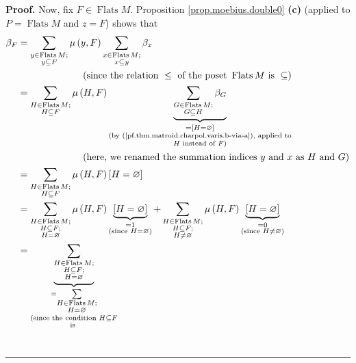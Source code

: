 \documentclass[numbers=enddot,12pt,final,onecolumn,notitlepage]{scrartcl}%
\theoremstyle{definition}
\newenvironment{proof}[1][Proof]{\noindent\textbf{#1.} }{\ \rule{0.5em}{0.5em}}
\let\sumnonlimits\sum
\renewcommand{\sum}{\sumnonlimits\limits}
\begin{document}
\begin{proof}
Now, fix $F\in\operatorname*{Flats}M$. Proposition \ref{prop.moebius.double0}
\textbf{(c)} (applied to $P=\operatorname*{Flats}M$ and $z=F$) shows that%
\begin{align}
\beta_{F}  &  =\sum_{\substack{y\in\operatorname*{Flats}M;\\y\subseteq F}%
}\mu\left(  y,F\right)  \sum_{\substack{x\in\operatorname*{Flats}%
M;\\x\subseteq y}}\beta_{x}\nonumber\\
&  \ \ \ \ \ \ \ \ \ \ \ \ \ \ \ \ \ \ \ \ \left(  \text{since the relation
}\leq\text{ of the poset }\operatorname*{Flats}M\text{ is }\subseteq\right)
\nonumber\\
&  =\sum_{\substack{H\in\operatorname*{Flats}M;\\H\subseteq F}}\mu\left(
H,F\right)  \underbrace{\sum_{\substack{G\in\operatorname*{Flats}%
M;\\G\subseteq H}}\beta_{G}}_{\substack{=\left[  H=\varnothing\right]
\\\text{(by (\ref{pf.thm.matroid.charpol.varis.b-via-a}), applied to}\\H\text{
instead of }F\text{)}}}\nonumber\\
&  \ \ \ \ \ \ \ \ \ \ \ \ \ \ \ \ \ \ \ \ \left(  \text{here, we renamed the
summation indices }y\text{ and }x\text{ as }H\text{ and }G\right) \nonumber\\
&  =\sum_{\substack{H\in\operatorname*{Flats}M;\\H\subseteq F}}\mu\left(
H,F\right)  \left[  H=\varnothing\right] \nonumber\\
&  =\sum_{\substack{H\in\operatorname*{Flats}M;\\H\subseteq F;\\H=\varnothing
}}\mu\left(  H,F\right)  \underbrace{\left[  H=\varnothing\right]
}_{\substack{=1\\\text{(since }H=\varnothing\text{)}}}+\sum_{\substack{H\in
\operatorname*{Flats}M;\\H\subseteq F;\\H\neq\varnothing}}\mu\left(
H,F\right)  \underbrace{\left[  H=\varnothing\right]  }%
_{\substack{=0\\\text{(since }H\neq\varnothing\text{)}}}\nonumber\\
&  =\underbrace{\sum_{\substack{H\in\operatorname*{Flats}M;\\H\subseteq
F;\\H=\varnothing}}}_{\substack{=\sum_{\substack{H\in\operatorname*{Flats}%
M;\\H=\varnothing}}\\\text{(since the condition }H\subseteq F\\\text{is
}}}
\end{align}
\end{proof}
\end{document}
